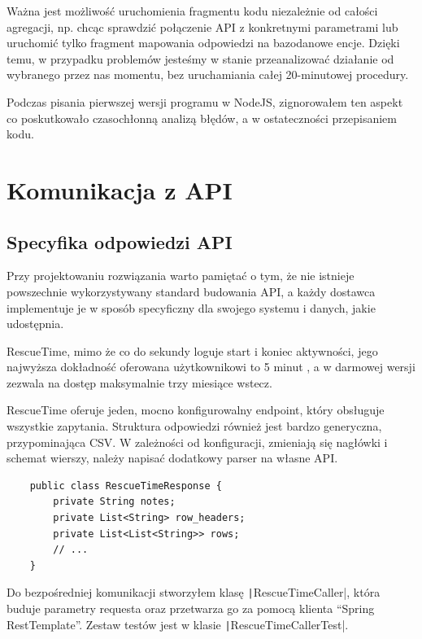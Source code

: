 \documentclass[openright]{xmgr}
\begin{document}
            Ważna jest możliwość uruchomienia fragmentu kodu niezależnie od całości agregacji, np. chcąc sprawdzić połączenie API z konkretnymi parametrami
            lub uruchomić tylko fragment mapowania odpowiedzi na bazodanowe encje.
            Dzięki temu, w przypadku problemów jesteśmy w stanie przeanalizować działanie od wybranego przez nas momentu,
            bez uruchamiania całej 20-minutowej procedury.

            Podczas pisania pierwszej wersji programu w NodeJS, zignorowałem ten aspekt co poskutkowało czasochłonną analizą błędów,
            a w ostateczności przepisaniem kodu.


    \section{Komunikacja z API}

        \subsection*{Specyfika odpowiedzi API}
            Przy projektowaniu rozwiązania warto pamiętać o tym, że nie istnieje powszechnie wykorzystywany standard budowania API,
            a każdy dostawca implementuje je w sposób specyficzny dla swojego systemu i danych, jakie udostępnia.

            RescueTime, mimo że co do sekundy loguje start i koniec aktywności,
            jego najwyższa dokładność oferowana użytkownikowi to 5 minut \cite{rescuetime:apidoc-precision},
            a w darmowej wersji zezwala na dostęp maksymalnie trzy miesiące wstecz.

            RescueTime oferuje jeden, mocno konfigurowalny endpoint, który obsługuje wszystkie zapytania.
            Struktura odpowiedzi również jest bardzo generyczna, przypominająca CSV.
            W zależności od konfiguracji, zmieniają się nagłówki i schemat wierszy, należy napisać dodatkowy parser na własne API.

            \begin{verbatim}
    public class RescueTimeResponse {
        private String notes;
        private List<String> row_headers;
        private List<List<String>> rows;
        // ...
    }
            \end{verbatim}

            Do bezpośredniej komunikacji stworzyłem klasę \texttt|RescueTimeCaller|, która buduje parametry requesta
            oraz przetwarza go za pomocą klienta ``Spring RestTemplate''. Zestaw testów jest w klasie \texttt|RescueTimeCallerTest|.
\end{document}
